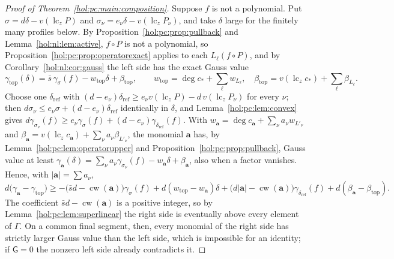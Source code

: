 \documentclass[11pt]{article}
\numberwithin{equation}{section}
\theoremstyle{definition}
\theoremstyle{remark}
\newcommand{\lc}{\operatorname{lc}}
\newcommand{\abs}[1]{\lvert#1\rvert}
\begin{document}
\begin{proof}[Proof of Theorem~\ref{hol:pc:main:composition}]
Suppose $f$ is not a polynomial. Put $\sigma=d\delta-v(\lc_z P)$ and
$\sigma_\nu=e_\nu\delta-v(\lc_z P_\nu)$, and take $\delta$ large for the finitely
many profiles below. By Proposition~\ref{hol:pc:prop:pullback} and
Lemma~\ref{hol:nl:lem:active}, $f\circ P$ is not a polynomial, so
Proposition~\ref{hol:pc:prop:operatorexact} applies to each $L_\ell(f\circ P)$,
and by Corollary~\ref{hol:nl:cor:gauss} the left side has the exact Gauss value
\begin{equation}\label{hol:pc:eq:top}
 \gamma_{\mathrm{top}}(\delta)=\bar s\,\gamma_\sigma(f)-w_{\mathrm{top}}\delta
 +\beta_{\mathrm{top}},\qquad
 w_{\mathrm{top}}=\deg c_*+\sum_\ell w_{L_\ell},\quad
 \beta_{\mathrm{top}}=v(\lc_z c_*)+\sum_\ell\beta_{L_\ell}.
\end{equation}
Choose one $\delta_{\mathrm{ref}}$ with $(d-e_\nu)\delta_{\mathrm{ref}}\ge e_\nu
v(\lc_z P)-d\,v(\lc_z P_\nu)$ for every $\nu$; then $d\sigma_\nu\le e_\nu\sigma+
(d-e_\nu)\delta_{\mathrm{ref}}$ identically in $\delta$, and
Lemma~\ref{hol:pc:lem:convex} gives $d\gamma_{\sigma_\nu}(f)\ge e_\nu
\gamma_\sigma(f)+(d-e_\nu)\gamma_{\delta_{\mathrm{ref}}}(f)$. With
$w_{\mathbf a}=\deg c_{\mathbf a}+\sum_\nu a_\nu w_{L'_\nu}$ and
$\beta_{\mathbf a}=v(\lc_z c_{\mathbf a})+\sum_\nu a_\nu\beta_{L'_\nu}$, the monomial
$\mathbf a$ has, by Lemma~\ref{hol:pc:lem:operatorupper} and
Proposition~\ref{hol:pc:prop:pullback}, Gauss value at least
$\gamma_{\mathbf a}(\delta)=\sum_\nu a_\nu\gamma_{\sigma_\nu}(f)-w_{\mathbf
a}\delta+\beta_{\mathbf a}$, also when a factor vanishes. Hence, with
$\abs{\mathbf a}=\sum a_\nu$,
\begin{equation}\label{hol:pc:eq:dominance}
 d\bigl(\gamma_{\mathbf a}-\gamma_{\mathrm{top}}\bigr)
 \ge-\bigl(\bar sd-\operatorname{cw}(\mathbf a)\bigr)\gamma_\sigma(f)
 +d(w_{\mathrm{top}}-w_{\mathbf a})\delta
 +\bigl(d\abs{\mathbf a}-\operatorname{cw}(\mathbf a)\bigr)
 \gamma_{\delta_{\mathrm{ref}}}(f)+d(\beta_{\mathbf a}-\beta_{\mathrm{top}}).
\end{equation}
The coefficient $\bar sd-\operatorname{cw}(\mathbf a)$ is a positive integer, so
by Lemma~\ref{hol:pc:lem:superlinear} the right side is eventually above every
element of $\Gamma$. On a common final segment, then, every monomial of the right
side has strictly larger Gauss value than the left side, which is impossible
for an identity; if $\mathsf G=0$ the nonzero left side already contradicts it.
\end{proof}
\end{document}
